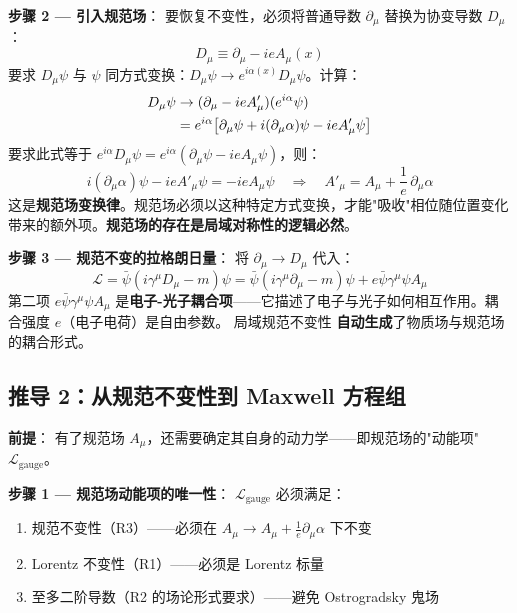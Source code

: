 \textbf{步骤 2 — 引入规范场}：\fbox{[N]}\fbox{[S]} 要恢复不变性，必须将普通导数 $\partial_\mu$ 替换为协变导数 $D_\mu$：
\begin{equation}
\boxed{D_\mu \equiv \partial_\mu - i e A_\mu(x)}
\end{equation}
要求 $D_\mu\psi$ 与 $\psi$ 同方式变换：$D_\mu\psi \to e^{i\alpha(x)}D_\mu\psi$。计算：
\begin{align}
D_\mu\psi &\to (\partial_\mu - ieA'_\mu)(e^{i\alpha}\psi) \notag \\
&= e^{i\alpha}\big[\partial_\mu\psi + i(\partial_\mu\alpha)\psi - ieA'_\mu\psi\big]
\end{align}
\fbox{[S]} 要求此式等于 $e^{i\alpha}D_\mu\psi = e^{i\alpha}(\partial_\mu\psi - ieA_\mu\psi)$，则：
\begin{equation}
i(\partial_\mu\alpha)\psi - ieA'_\mu\psi = -ieA_\mu\psi
\quad\Rightarrow\quad
\boxed{A'_\mu = A_\mu + \frac{1}{e}\,\partial_\mu\alpha}
\end{equation}
\fbox{[N]}\fbox{[S]} 这是\textbf{规范场变换律}。规范场必须以这种特定方式变换，才能"吸收"相位随位置变化带来的额外项。\textbf{规范场的存在是局域对称性的逻辑必然}。

\textbf{步骤 3 — 规范不变的拉格朗日量}：\fbox{[S]} 将 $\partial_\mu \to D_\mu$ 代入：
\begin{equation}
\mathcal{L} = \bar{\psi}(i\gamma^\mu D_\mu - m)\psi
= \bar{\psi}(i\gamma^\mu\partial_\mu - m)\psi + e\bar{\psi}\gamma^\mu\psi A_\mu
\end{equation}
第二项 $e\bar{\psi}\gamma^\mu\psi A_\mu$ 是\textbf{电子-光子耦合项}——它描述了电子与光子如何相互作用。耦合强度 $e$（电子电荷）是自由参数。\fbox{[S]} 局域规范不变性 \textbf{自动生成}了物质场与规范场的耦合形式。

\subsection{推导 2：从规范不变性到 Maxwell 方程组}

\textbf{前提}：\fbox{[N]} 有了规范场 $A_\mu$，还需要确定其自身的动力学——即规范场的"动能项" $\mathcal{L}_{\text{gauge}}$。

\textbf{步骤 1 — 规范场动能项的唯一性}：\fbox{[N]} $\mathcal{L}_{\text{gauge}}$ 必须满足：
\begin{enumerate}
\item 规范不变性（R3）——必须在 $A_\mu \to A_\mu + \frac{1}{e}\partial_\mu\alpha$ 下不变
\item Lorentz 不变性（R1）——必须是 Lorentz 标量
\item 至多二阶导数（R2 的场论形式要求）——避免 Ostrogradsky 鬼场
\end{enumerate}

